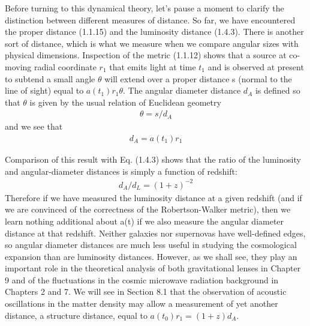 \documentclass[11pt]{ltjsarticle}
\theoremstyle{plain}
\theoremstyle{break}
\begin{document}
Before turning to this dynamical theory, let’s pause a moment to clarify the distinction between different measures of distance.
So far, we have encountered the proper distance (1.1.15) and the luminosity distance (1.4.3).
There is another sort of distance, which is what we measure when we compare angular sizes with physical dimensions.
Inspection of the metric (1.1.12) shows that a source at co-moving radial coordinate $r_1$ that emits light at time $t_1$ and is observed at present to subtend a small angle $\theta$ will extend over a proper distance s (normal to the line of sight) equal to $a(t_1)r_1\theta$. The angular diameter distance $d_A$ is defined so that $\theta$ is given by the usual relation of Euclidean geometry
\begin{align}
  \theta = s/d_A
\end{align}
and we see that
\begin{align}
  d_A = a(t_1) r_1
\end{align}

Comparison of this result with Eq. (1.4.3) shows that the ratio of the luminosity and angular-diameter distances is simply a function of redshift:
\begin{align}
  d_{A} / d_{L}=(1+z)^{-2}
\end{align}
Therefore if we have measured the luminosity distance at a given redshift (and if we are convinced of the correctness of the Robertson-Walker metric), then we learn nothing additional about a(t) if we also measure the angular diameter distance at that redshift.
Neither galaxies nor supernovas have well-defined edges, so angular diameter distances are much less useful in studying the cosmological expansion than are luminosity distances. However, as we shall see, they play an important role in the theoretical analysis of both gravitational lenses in Chapter 9 and of the fluctuations in the cosmic microwave radiation background in Chapters 2 and 7.
We will see in Section 8.1 that the observation of acoustic oscillations in the matter density may allow a measurement of yet another distance, a structure distance, equal to $a(t_0)r_1 = (1 + z)d_A$.


\newpage
\setcounter{section}{4}
\end{document}

